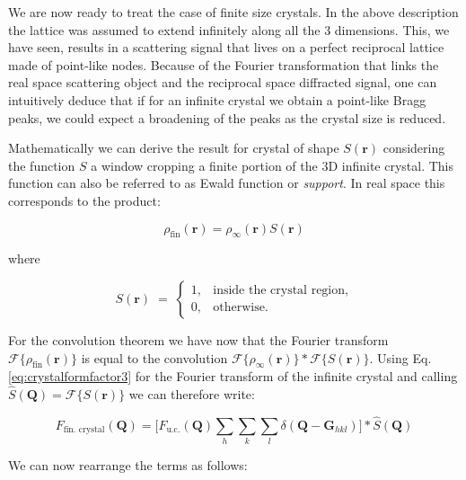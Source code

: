 We are now ready to treat the case of finite size crystals. In the above description the lattice was assumed to extend 
infinitely along all the 3 dimensions. This, we have seen, results in a scattering signal that lives on a perfect reciprocal 
lattice made of point-like nodes. Because of the Fourier transformation that links the real space scattering object and 
the reciprocal space diffracted signal, one can intuitively deduce that if for an infinite crystal we obtain a point-like 
Bragg peaks, we could expect a broadening of the peaks as the crystal size is reduced. 

Mathematically we can derive the result for crystal of shape $S(\mathbf r)$ considering the function $S$ a window cropping 
a finite portion of the 3D infinite crystal. This function can also be referred to as Ewald function \cite{Ewald_1940} or \textit{support}.
 In real space this corresponds to the product: 


\begin{equation}
    \rho_{\text{fin}}(\mathbf{r}) = \rho_{\infty}(\mathbf{r}) S(\mathbf{r})
    \label{eq:window}
\end{equation}

where 

\begin{equation}
    S(\mathbf r) \;=\;
    \begin{cases}
    1, & \text{inside the crystal region}
    , \\[6pt]
    0, & \text{otherwise}.
    \end{cases}
    \label{eq:shape_function_general}
\end{equation}
    
For the convolution theorem we have now that the Fourier transform $\mathcal{F\{}{\rho_{\text{fin}}(\mathbf{r})\}}$ is 
equal to the convolution $ \mathcal{F\{}{\rho_{\infty}(\mathbf{r})\} \ast \mathcal{F\{}S(\mathbf{r})\}}$. 
Using Eq.\ref{eq:crystalformfactor3} for the Fourier transform of the infinite crystal and calling $\widehat S(\mathbf{Q})= \mathcal{F} \{S(\mathbf{r})\}$ 
we can therefore write: 

\begin{equation}
    F_{\text{fin. crystal}}(\mathbf{Q}) = \Big[ F_{\text{u.c.}}(\mathbf{Q}) 
    \sum_{h} \sum_{k} \sum_{l} 
    \delta\!\left(\mathbf Q - \mathbf{G}_{hkl}\right) \Big] \ast \widehat S(\mathbf{Q})
    \label{eq:fin_cryst1}
\end{equation}

We can now rearrange the terms as follows: 

